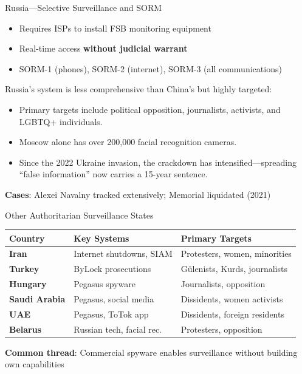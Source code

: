 ﻿\documentclass[aspectratio=169,11pt]{beamer}
\begin{document}
\begin{frame}{Russia---Selective Surveillance and SORM}
\begin{conceptbox}
\small
\begin{itemize}
    \item Requires ISPs to install FSB monitoring equipment
    \item Real-time access \textbf{without judicial warrant}
    \item SORM-1 (phones), SORM-2 (internet), SORM-3 (all communications)
\end{itemize}
\end{conceptbox}

\vspace{0.2em}
Russia's system is less comprehensive than China's but highly targeted:
\begin{itemize}
    \item Primary targets include political opposition, journalists, activists, and LGBTQ+ individuals.
    \item Moscow alone has over 200,000 facial recognition cameras.
    \item Since the 2022 Ukraine invasion, the crackdown has intensified---spreading ``false information'' now carries a 15-year sentence.
\end{itemize}

\textbf{Cases}: Alexei Navalny tracked extensively; Memorial liquidated (2021)
\end{frame}

\begin{frame}{Other Authoritarian Surveillance States}
\begin{table}[h]
\centering
\scriptsize
\begin{tabular}{@{}lll@{}}
\toprule
\textbf{Country} & \textbf{Key Systems} & \textbf{Primary Targets} \\
\midrule
\textbf{Iran} & Internet shutdowns, SIAM & Protesters, women, minorities \\
\textbf{Turkey} & ByLock prosecutions & G\"ulenists, Kurds, journalists \\
\textbf{Hungary} & Pegasus spyware & Journalists, opposition \\
\textbf{Saudi Arabia} & Pegasus, social media & Dissidents, women activists \\
\textbf{UAE} & Pegasus, ToTok app & Dissidents, foreign residents \\
\textbf{Belarus} & Russian tech, facial rec. & Protesters, opposition \\
\bottomrule
\end{tabular}
\end{table}

\vspace{0.2em}
\textbf{Common thread}: Commercial spyware enables surveillance without building own capabilities
\end{frame}
\end{document}
